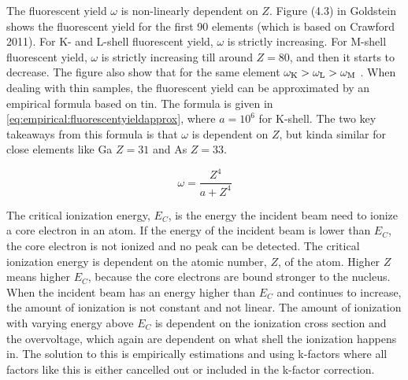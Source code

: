 The fluorescent yield $\omega$ is non-linearly dependent on $Z$.
Figure (4.3)  in Goldstein \cite{goldstein_scanning_2018}  shows the fluorescent yield for the first 90 elements (which is based on Crawford 2011).
For K- and L-shell fluorescent yield, $\omega$ is strictly increasing.
For M-shell fluorescent yield, $\omega$ is strictly increasing till around $Z=80$, and then it starts to decrease.
The figure also show that for the same element $\omega_{\textnormal{K}}  > \omega_{\textnormal{L}} > \omega_{\textnormal{M}}$ .
When dealing with thin samples, the fluorescent yield can be approximated by an empirical formula based on tin.
The formula is given in \cref{eq:empirical:fluorescentyieldapprox}, where $a=10^6$ for K-shell. 
The two key takeaways from this formula is that $\omega$ is dependent on $Z$, but kinda similar for close elements like Ga $Z = 31$ and As $Z = 33$.



\begin{equation}
    \label{eq:empirical:fluorescentyieldapprox}
    \omega = \frac{Z^4}{a + Z^4}
\end{equation}

The critical ionization energy, $E_C$, is the energy the incident beam need to ionize a core electron in an atom.
If the energy of the incident beam is lower than $E_C$, the core electron is not ionized and no peak can be detected.
The critical ionization energy is dependent on the atomic number, $Z$, of the atom.
Higher $Z$ means higher $E_C$, because the core electrons are bound stronger to the nucleus.
When the incident beam has an energy higher than $E_C$ and continues to increase, the amount of ionization is not constant and not linear.
The amount of ionization with varying energy above $E_C$ is dependent on the ionization cross section and the overvoltage, which again are dependent on what shell the ionization happens in.
The solution to this is empirically estimations and using k-factors where all factors like this is either cancelled out or included in the k-factor correction.

